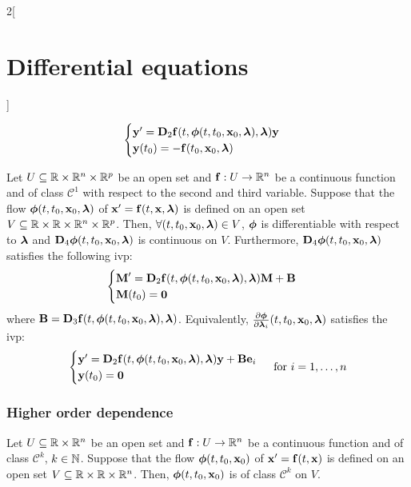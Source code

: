 \documentclass[../../../main.tex]{subfiles}
\begin{document}
\begin{multicols}{2}[\section{Differential equations}]
\begin{theorem}[Dependence on $t_0$]
    \begin{equation*}
      \begin{cases}
        \vf{y}'      =\vf{D}_2\vf{f}(t,\vf{\phi}(t,t_0,\vf{x}_0,\vf{\lambda}),\vf{\lambda})\vf{y} \\
        \vf{y}(t_0)  = -\vf{f}(t_0,\vf{x}_0,\vf{\lambda})
      \end{cases}
    \end{equation*}
  \end{theorem}
  \begin{theorem}
    Let $U\subseteq\RR\times\RR^n\times\RR^p$ be an open set and $\vf{f}:U\rightarrow\RR^n$ be a continuous function and of class $\mathcal{C}^1$ with respect to the second and third variable. Suppose that the flow $\vf{\phi}(t,t_0,\vf{x}_0,\vf{\lambda})$ of $\vf{x}'=\vf{f}(t,\vf{x},\vf{\lambda})$ is defined on an open set $V\subseteq\RR\times\RR\times\RR^n\times\RR^p$. Then, $\forall (t,t_0,\vf{x}_0,\vf{\lambda})\in V$, $\vf{\phi}$ is differentiable with respect to $\vf{\lambda}$ and $\vf{D}_4\vf{\phi}(t,t_0,\vf{x}_0,\vf{\lambda})$ is continuous on $V$. Furthermore, $\vf{D}_4\vf{\phi}(t,t_0,\vf{x}_0,\vf{\lambda})$ satisfies the following ivp:
    \begin{equation*}
      \begin{cases}
        \vf{M}'      =\vf{D}_2\vf{f}(t,\vf{\phi}(t,t_0,\vf{x}_0,\vf{\lambda}),\vf{\lambda})\vf{M}+ \vf{B} \\
        \vf{M}(t_0)  =\vf{0}
      \end{cases}
    \end{equation*}
    where $\vf{B}=\vf{D}_3\vf{f}(t,\vf{\phi}(t,t_0,\vf{x}_0,\vf{\lambda}),\vf{\lambda})$. Equivalently, $\frac{\partial\vf{\phi}}{\partial \vf{\lambda}_i}(t,t_0,\vf{x}_0,\vf{\lambda})$ satisfies the ivp:
    $$
      \begin{cases}
        \vf{y}'      =\vf{D}_2\vf{f}(t,\vf{\phi}(t,t_0,\vf{x}_0,\vf{\lambda}),\vf{\lambda})\vf{y}+\vf{B}\vf{e}_i \\
        \vf{y}(t_0)  =\vf{0}
      \end{cases}\;\text{for }i=1,\ldots,n
    $$
  \end{theorem}
  \subsubsection{Higher order dependence}
  \begin{theorem}
    Let $U\subseteq\RR\times\RR^n$ be an open set and $\vf{f}:U\rightarrow\RR^n$ be a continuous function and of class $\mathcal{C}^k$, $k\in\NN$. Suppose that the flow $\vf{\phi}(t,t_0,\vf{x}_0)$ of $\vf{x}'=\vf{f}(t,\vf{x})$ is defined on an open set $V\subseteq\RR\times\RR\times\RR^n$. Then, $\vf{\phi}(t,t_0,\vf{x}_0)$ is of class $\mathcal{C}^k$ on $V$.
  \end{theorem}

\end{multicols}
\end{document}
